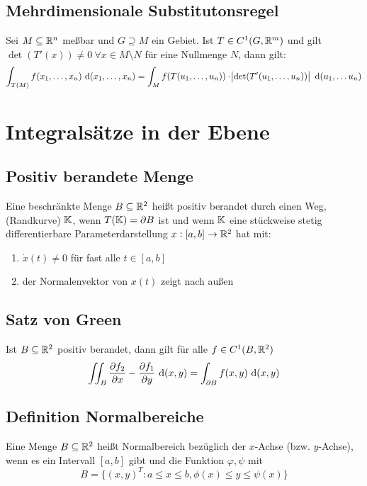 \subsection{Mehrdimensionale Substitutonsregel}
Sei $M \subseteq \mathbb{R}^n$ meßbar und $G \supseteq M$ ein Gebiet. Ist $T\in C^1(G, \mathbb{R}^m)$
und gilt $\det(T'(x)) \neq 0\ \forall x \in M \setminus N$ für eine Nullmenge $N$,
dann gilt:
\begin{equation*}
    \int_{T(M)} f(x_1, \ldots, x_n) \text{ d}(x_1, \ldots, x_n) =
    \int_M f(T(u_1, \ldots, u_n)) \cdot \abs{\det(T'(u_1, \ldots, u_n))} \text{ d}(u_1, \ldots
    u_n)
\end{equation*}

\section{Integralsätze in der Ebene}
\subsection{Positiv berandete Menge}
Eine beschränkte Menge $B \subseteq \mathbb{R}^2$ heißt positiv berandet durch einen Weg,
(Randkurve) $\mathbb{K}$, wenn $T(\mathbb{K}) = \partial B$ ist und wenn $\mathbb{K}$ eine stückweise
stetig differentierbare Parameterdarstellung $x: [a,b] \to \mathbb{R}^2$ hat mit:
\begin{enumerate}[label = (\roman*)]
    \item $\dot{x}(t) \neq 0$ für fast alle $t \in [a,b]$
    \item der Normalenvektor von $x(t)$ zeigt nach außen
\end{enumerate}

\subsection{Satz von Green}
Ist $B \subseteq \mathbb{R}^2$ positiv berandet, dann gilt für alle $f \in C^1(B, \mathbb{R}^2)$
\begin{equation*}
    \iint_B \frac{\partial f_2}{\partial x} - \frac{\partial f_1}{\partial y}
    \text{ d}(x,y) =
    \int_{\partial B} f(x,y) \text{ d}(x,y)
\end{equation*}

\subsection{Definition Normalbereiche}
Eine Menge $B \subseteq \mathbb{R}^2$ heißt Normalbereich bezüglich der $x$-Achse
(bzw. $y$-Achse), wenn es ein Intervall $[a,b]$ gibt und die Funktion
$\varphi, \psi$ mit
\begin{equation*}
    B = \{ {(x,y)}^T: a \leq x \leq b, \phi(x) \leq y \leq \psi(x) \}
\end{equation*}

